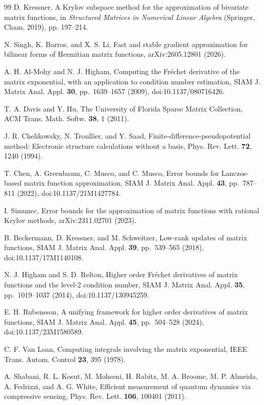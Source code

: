 \documentclass[10pt,letterpaper,twoside]{article}
\begin{document}
\begin{thebibliography}{99}
D. Kressner, A Krylov subspace method for the approximation of bivariate matrix
functions, in \textit{Structured Matrices in Numerical Linear Algebra}
(Springer, Cham, 2019), pp. 197--214.

N. Singh, K. Barros, and X. S. Li, Fast and stable gradient approximation for
bilinear forms of Hermitian matrix functions, arXiv:2605.12801 (2026).

A. H. Al-Mohy and N. J. Higham, Computing the Fr\'echet derivative of the matrix
exponential, with an application to condition number estimation,
SIAM J. Matrix Anal. Appl. \textbf{30}, pp.~1639--1657 (2009), doi:10.1137/080716426.

T. A. Davis and Y. Hu, The University of Florida Sparse Matrix Collection,
ACM Trans. Math. Softw. \textbf{38}, 1 (2011).

J. R. Chelikowsky, N. Troullier, and Y. Saad, Finite-difference-pseudopotential
method: Electronic structure calculations without a basis, Phys. Rev. Lett.
\textbf{72}, 1240 (1994).

T. Chen, A. Greenbaum, C. Musco, and C. Musco, Error bounds for Lanczos-based
matrix function approximation, SIAM J. Matrix Anal. Appl. \textbf{43}, pp.~787--811 (2022),
doi:10.1137/21M1427784.

I. Simunec, Error bounds for the approximation of matrix functions with rational
Krylov methods, arXiv:2311.02701 (2023).

B. Beckermann, D. Kressner, and M. Schweitzer, Low-rank updates of matrix
functions, SIAM J. Matrix Anal. Appl. \textbf{39}, pp.~539--565 (2018), doi:10.1137/17M1140108.

N. J. Higham and S. D. Relton, Higher order Fr\'echet derivatives of matrix
functions and the level-2 condition number, SIAM J. Matrix Anal. Appl. \textbf{35}, pp.~1019--1037
(2014), doi:10.1137/130945259.

E. H. Rubensson, A unifying framework for higher order derivatives of matrix
functions, SIAM J. Matrix Anal. Appl. \textbf{45}, pp.~504--528 (2024),
doi:10.1137/23M1580589.

C. F. Van Loan, Computing integrals involving the matrix exponential, IEEE
Trans. Autom. Control \textbf{23}, 395 (1978).

A. Shabani, R. L. Kosut, M. Mohseni, H. Rabitz, M. A. Broome,
M. P. Almeida, A. Fedrizzi, and A. G. White, Efficient measurement of quantum
dynamics via compressive sensing, Phys. Rev. Lett. \textbf{106}, 100401 (2011).


\end{thebibliography}
\end{document}
